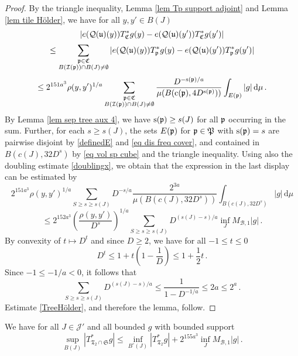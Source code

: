 {\begin{proof}
        By the triangle inequality, Lemma \ref{lem Tp support adjoint} and Lemma \ref{lem tile Hölder}, we have for all $y, y' \in B(J)$
        \begin{equation}
            \label{eq C Lip}
            |e(\mathcal{Q}(\mathfrak u)(y)) T_{\mathfrak C}^* g(y) - e(\mathcal{Q}(\mathfrak u)(y')) T_{\mathfrak C}^* g(y')|
        \end{equation}
        $$
            \leq \sum_{\substack{\mathfrak p \in \mathfrak C\\ B(\mathcal{I}(\mathfrak p)) \cap B(J) \neq \emptyset}} |e(\mathcal{Q}(\mathfrak u)(y)) T_{\mathfrak p}^* g(y) - e(\mathcal{Q}(\mathfrak u)(y')) T_{\mathfrak p}^* g(y')|
        $$
        $$
            \le 2^{151a^3}\rho(y,y')^{1/a}  \sum_{\substack{\mathfrak p \in \mathfrak C\\ B(\mathcal{I}(\mathfrak p)) \cap B(J) \neq \emptyset}} \frac{D^{- \mathrm{s}(\mathfrak p)/a}}{\mu(B(\mathrm{c}(\mathfrak p), 4D^{\mathrm{s}(\mathfrak p)}))} \int_{E(\mathfrak p)} |g| \, \mathrm{d}\mu\,.
        $$
        By Lemma \ref{lem sep tree aux 4}, we have $\mathrm{s}(\mathfrak p) \ge s(J)$ for all $\mathfrak p$ occurring in the sum. Further, for each $s \ge s(J)$, the sets $E(\mathfrak p)$ for $\mathfrak p \in \mathfrak P$ with $\mathrm{s}(\mathfrak p) = s$ are pairwise disjoint by \eqref{definedE} and \eqref{eq dis freq cover}, and contained in $B(c(J), 32D^{s})$ by \eqref{eq vol sp cube} and the triangle inequality. Using also the doubling estimate \eqref{doublingx}, we obtain that the expression in the last display can be estimated by
        $$
            2^{151a^3}\rho(y,y')^{1/a} \sum_{S \ge s \ge s(J)}  D^{-s/a}  \frac{2^{3a}}{\mu(B(c(J), 32D^{s}))} \int_{B(c(J), 32D^{s})} |g| \, \mathrm{d}\mu
        $$
        $$
            \le 2^{152a^3} \left(\frac{\rho(y,y')}{D^s}\right)^{1/a} \sum_{S \ge s \ge s(J)} D^{(s(J) - s)/a} \inf_J M_{\mathcal{B},1} |g|\,.
        $$
        By convexity of $t \mapsto D^t$ and since $D \ge 2$, we have for all $-1 \le t \le 0$
        $$
            D^t \le 1 + t(1 - \frac{1}{D}) \le 1 + \frac{1}{2}t\,.
        $$
        Since $-1 \le -1/a <0$, it follows that
        $$
            \sum_{S \ge s \ge s(J)} D^{(s(J) - s)/a} \le \frac{1}{1 - D^{-1/a}} \le 2a \le 2^a\,.
        $$
        Estimate \eqref{TreeHölder}, and therefore the lemma, follow.
    \end{proof}

    \begin{lemma}
        \label{lem sep tree aux 5}
        We have for all $J \in \mathcal{J}'$ and all bounded $g$ with bounded support
        $$
            \sup_{B(J)} |T^*_{\mathfrak{T}_2 \cap \mathfrak{S}} g| \le \inf_{B^\circ{}(J)} |T^*_{\mathfrak{T}_2} g| + 2^{155a^3} \inf_{J} M_{\mathcal{B},1}|g|\,.
        $$
    \end{lemma}

}
